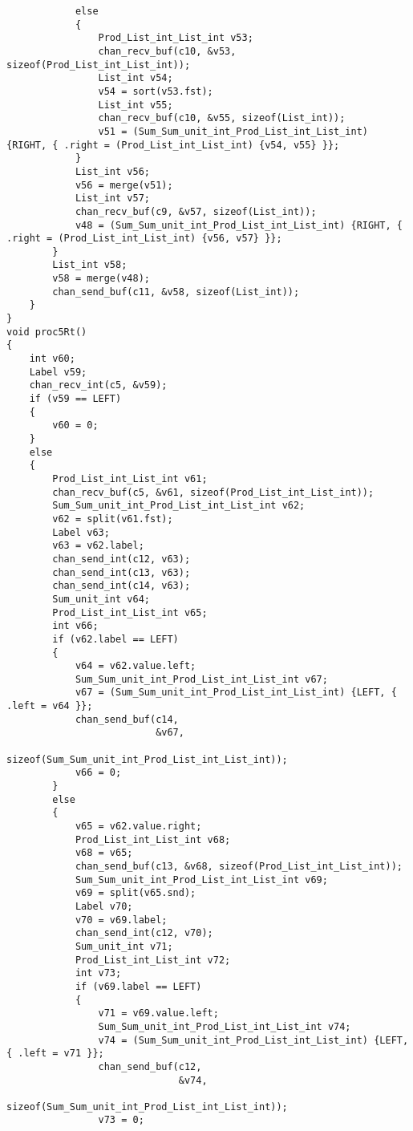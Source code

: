 \begin{lstlisting}
            else
            {
                Prod_List_int_List_int v53;
                chan_recv_buf(c10, &v53, sizeof(Prod_List_int_List_int));
                List_int v54;
                v54 = sort(v53.fst);
                List_int v55;
                chan_recv_buf(c10, &v55, sizeof(List_int));
                v51 = (Sum_Sum_unit_int_Prod_List_int_List_int) {RIGHT, { .right = (Prod_List_int_List_int) {v54, v55} }};
            }
            List_int v56;
            v56 = merge(v51);
            List_int v57;
            chan_recv_buf(c9, &v57, sizeof(List_int));
            v48 = (Sum_Sum_unit_int_Prod_List_int_List_int) {RIGHT, { .right = (Prod_List_int_List_int) {v56, v57} }};
        }
        List_int v58;
        v58 = merge(v48);
        chan_send_buf(c11, &v58, sizeof(List_int));
    }
}
void proc5Rt()
{
    int v60;
    Label v59;
    chan_recv_int(c5, &v59);
    if (v59 == LEFT)
    {
        v60 = 0;
    }
    else
    {
        Prod_List_int_List_int v61;
        chan_recv_buf(c5, &v61, sizeof(Prod_List_int_List_int));
        Sum_Sum_unit_int_Prod_List_int_List_int v62;
        v62 = split(v61.fst);
        Label v63;
        v63 = v62.label;
        chan_send_int(c12, v63);
        chan_send_int(c13, v63);
        chan_send_int(c14, v63);
        Sum_unit_int v64;
        Prod_List_int_List_int v65;
        int v66;
        if (v62.label == LEFT)
        {
            v64 = v62.value.left;
            Sum_Sum_unit_int_Prod_List_int_List_int v67;
            v67 = (Sum_Sum_unit_int_Prod_List_int_List_int) {LEFT, { .left = v64 }};
            chan_send_buf(c14,
                          &v67,
                          sizeof(Sum_Sum_unit_int_Prod_List_int_List_int));
            v66 = 0;
        }
        else
        {
            v65 = v62.value.right;
            Prod_List_int_List_int v68;
            v68 = v65;
            chan_send_buf(c13, &v68, sizeof(Prod_List_int_List_int));
            Sum_Sum_unit_int_Prod_List_int_List_int v69;
            v69 = split(v65.snd);
            Label v70;
            v70 = v69.label;
            chan_send_int(c12, v70);
            Sum_unit_int v71;
            Prod_List_int_List_int v72;
            int v73;
            if (v69.label == LEFT)
            {
                v71 = v69.value.left;
                Sum_Sum_unit_int_Prod_List_int_List_int v74;
                v74 = (Sum_Sum_unit_int_Prod_List_int_List_int) {LEFT, { .left = v71 }};
                chan_send_buf(c12,
                              &v74,
                              sizeof(Sum_Sum_unit_int_Prod_List_int_List_int));
                v73 = 0;

\end{lstlisting}
